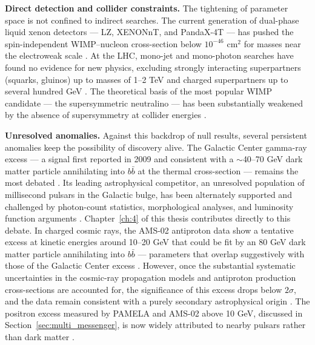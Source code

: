\textbf{Direct detection and collider constraints.}
The tightening of parameter space is not confined to indirect searches.
The current generation of dual-phase liquid xenon detectors --- LZ, XENONnT, and PandaX-4T --- has pushed the spin-independent WIMP--nucleon cross-section below $10^{-46}$ cm$^2$ for masses near the electroweak scale \cite{Cirelli:2024ssz,Hooper:2024}.
At the LHC, mono-jet and mono-photon searches have found no evidence for new physics, excluding strongly interacting superpartners (squarks, gluinos) up to masses of 1--2 TeV and charged superpartners up to several hundred GeV \cite{Cirelli:2024ssz,Hooper:2024}.
The theoretical basis of the most popular WIMP candidate --- the supersymmetric neutralino --- has been substantially weakened by the absence of supersymmetry at collider energies \cite{Cirelli:2024ssz}.

\textbf{Unresolved anomalies.}
Against this backdrop of null results, several persistent anomalies keep the possibility of discovery alive.
The Galactic Center gamma-ray excess --- a signal first reported in 2009 and consistent with a $\sim$40--70 GeV dark matter particle annihilating into $b\bar{b}$ at the thermal cross-section --- remains the most debated \cite{Daylan:2014rsa,Cirelli:2024ssz,Hooper:2024}.
Its leading astrophysical competitor, an unresolved population of millisecond pulsars in the Galactic bulge, has been alternately supported and challenged by photon-count statistics, morphological analyses, and luminosity function arguments \cite{Cirelli:2024ssz}.
Chapter~\ref{ch:4} of this thesis contributes directly to this debate.
In charged cosmic rays, the AMS-02 antiproton data show a tentative excess at kinetic energies around 10--20 GeV that could be fit by an 80 GeV dark matter particle annihilating into $b\bar{b}$ --- parameters that overlap suggestively with those of the Galactic Center excess \cite{Cirelli:2024ssz}.
However, once the substantial systematic uncertainties in the cosmic-ray propagation models and antiproton production cross-sections are accounted for, the significance of this excess drops below $2\sigma$, and the data remain consistent with a purely secondary astrophysical origin \cite{Cirelli:2024ssz}.
The positron excess measured by PAMELA and AMS-02 above 10 GeV, discussed in Section~\ref{sec:multi_messenger}, is now widely attributed to nearby pulsars rather than dark matter \cite{Cirelli:2024ssz,Hooper:2024}.

